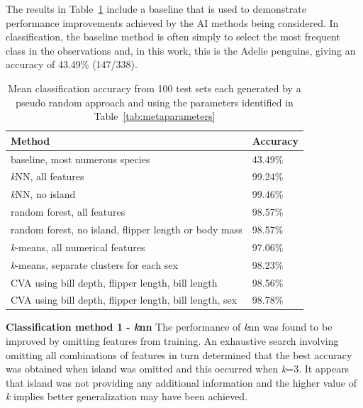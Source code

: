 \documentclass[12pt]{article}
\begin{document}
The results in Table~\ref{tab:results} include a baseline that is used to demonstrate performance improvements achieved by the AI methods being considered. 
In classification, the baseline method is often simply to select the most frequent class in the observations and, 
in this work, this is the Adelie penguins, giving an accuracy of 43.49\% (147/338).

\begin{table} %
  \small
  \begin{center}
  \vspace{-3\baselineskip} %
  \setlength{\abovecaptionskip}{5pt}
  \setlength{\belowcaptionskip}{5pt}
  \fontsize{10}{10}\selectfont %
  \begin{tabular}{l|l}
  Method & Accuracy\\
  \hline
  baseline, most numerous species & 43.49\% \\
  \hline
  \textit{k}NN, all features	& 99.24\% \\
  \textit{k}NN, no island &	99.46\% \\
  \hline
  random forest, all features	& 98.57\% \\
  random forest, no island, flipper length or body mass	& 98.57\% \\
  \hline
  \textit{k}-means, all numerical features & 97.06\% \\
  \textit{k}-means, separate clusters for each sex & 98.23\% \\
  \hline
  CVA using bill depth, flipper length, bill length	& 98.56\% \\
  CVA using bill depth, flipper length, bill length, sex &98.78\% \\
  \hline
  \end{tabular}
  \vspace{-1.5\baselineskip} %
  \end{center} 
  \caption{Mean classification accuracy from 100 test sets each generated by a pseudo random approach 
  and using the parameters identified in Table~\ref{tab:metaparameters}}
  \vspace{0\baselineskip} %
  \label{tab:results}
\end{table} 

\textbf{Classification method 1 - \textit{k}nn}  
The performance of \textit{k}nn was found to be improved by omitting features from training. 
An exhaustive search involving omitting all combinations of features in turn determined that the best accuracy was obtained 
when island was omitted and this occurred when \textit{k}=3. It appears that island was not providing any additional information 
and the higher value of \textit{k} implies better generalization may have been achieved.
\end{document}
